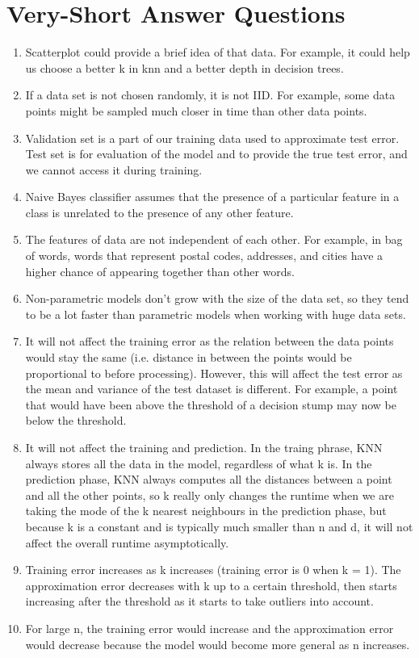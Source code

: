 \documentclass{article}
\begin{document}
\section{Very-Short Answer Questions}

\begin{enumerate}
\item  Scatterplot could provide a brief idea of that data. For example, it could help us choose a better k in knn and a better depth in decision trees.
\item  If a data set is not chosen randomly, it is not IID. For example, some data points might be sampled much closer in time than other data points.
\item Validation set is a part of our training data used to approximate test error. Test set is for evaluation of the model and to provide the true test error, and we cannot access it during training.
\item Naive Bayes classifier assumes that the presence of a particular feature in a class is unrelated to the presence of any other feature.
\item The features of data are not independent of each other. For example, in bag of words, words that represent postal codes, addresses, and cities have a higher chance of appearing together than other words.
\item Non-parametric models don't grow with the size of the data set, so they tend to be a lot faster than parametric models when working with huge data sets.
\item It will not affect the training error as the relation between the data points would stay the same (i.e. distance in between the points would be proportional to before processing). However, this will affect the test error as the mean and variance of the test dataset is different. For example, a point that would have been above the threshold of a decision stump may now be below the threshold.
\item It will not affect the training and prediction. In the traing phrase, KNN always stores all the data in the model, regardless of what k is. In the prediction phase, KNN always computes all the distances between a point and all the other points, so k really only changes the runtime when we are taking the mode of the k nearest neighbours in the prediction phase, but because k is a constant and is typically much smaller than n and d, it will not affect the overall runtime asymptotically.
\item Training error increases as k increases (training error is 0 when k = 1). The approximation error decreases with k up to a certain threshold, then starts increasing after the threshold as it starts to take outliers into account.
\item For large n, the training error would increase and the approximation error would decrease because the model would become more general as n increases.
\end{enumerate}
\end{document}
